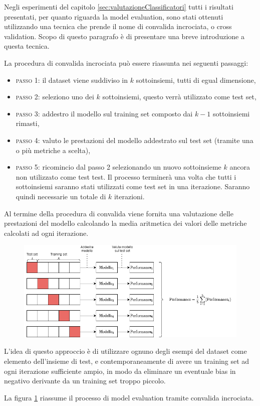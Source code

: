 \documentclass[../../main.tex]{subfiles}
\begin{document}
    Negli esperimenti del capitolo \ref{sec:valutazioneClassificatori} tutti i risultati presentati, per quanto riguarda la model evaluation, sono stati ottenuti utilizzando una tecnica che prende il nome di convalida incrociata, o cross validation. Scopo di questo paragrafo è di presentare una breve introduzione a questa tecnica.

    La procedura di convalida incrociata può essere riassunta nei seguenti passaggi: 
    \begin{itemize}
        \item \textsc{passo 1}: il dataset viene suddiviso in $k$ sottoinsiemi, tutti di egual dimensione,
        \item \textsc{passo 2}: seleziono uno dei $k$ sottoinsiemi, questo verrà utilizzato come test set,
        \item \textsc{passo 3}: addestro il modello sul training set composto dai $k-1$ sottoinsiemi rimasti,
        \item \textsc{passo 4}: valuto le prestazioni del modello addestrato sul test set (tramite una o più metriche a scelta),
        \item \textsc{passo 5}: ricomincio dal passo 2 selezionando un nuovo sottoinsieme $k$ ancora non utilizzato come test test. Il processo terminerà una volta che tutti i sottoinsiemi saranno stati utilizzati come test set in una iterazione. Saranno quindi necessarie un totale di $k$ iterazioni.
    \end{itemize}

    Al termine della procedura di convalida viene fornita una valutazione delle prestazioni del modello calcolando la media aritmetica dei valori delle metriche calcolati ad ogni iterazione.

    \begin{figure}[H]
        \centering
        \includegraphics[width=\textwidth]{immagini/6_3/cross_validation.drawio.png}
        \caption{}
        \label{fig:crossvalidation}
    \end{figure}

    L'idea di questo approccio è di utilizzare ognuno degli esempi del dataset come elemento dell'insieme di test, e contemporaneamente di avere un training set ad ogni iterazione sufficiente ampio, in modo da eliminare un eventuale bias in negativo derivante da un training set troppo piccolo.

    La figura \ref{fig:crossvalidation} riassume il processo di model evaluation tramite convalida incrociata.
\end{document}
